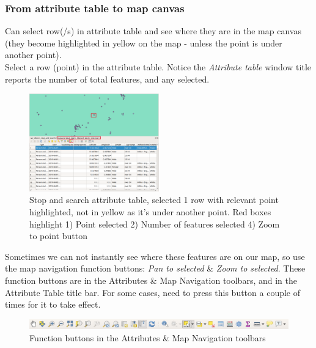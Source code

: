 \subsubsection{From attribute table to map canvas}
Can select row(/s) in attribute table and see where they are in the map canvas (they become highlighted in yellow on the map - unless the point is under another point).\\

Select a row (point) in the attribute table. Notice the \textit{Attribute table} window title reports the number of total features, and any selected.\\

\begin{figure}[!h]
	\centering
	\includegraphics[width=0.5\textwidth]{images/stop_search_one_row_selected_redbox.png}%
	\caption{Stop and search attribute table, selected 1 row with relevant point highlighted, not in yellow as it's under another point. Red boxes highlight 1) Point selected 2) Number of features selected 4) Zoom to point button}
	\label{ft_fig_firstfig3}
\end{figure}

Sometimes we can not instantly see where these features are on our map, so use the map navigation function buttons: \textit{Pan to selected} \& \textit{Zoom to selected}. These function buttons are in the Attributes \& Map Navigation toolbars, and in the Attribute Table title bar. For some cases, need to press this button a couple of times for it to take effect.

\begin{figure}[!h]
	\centering
	\includegraphics[width=1\textwidth]{images/attribute_and_map_navigation_toolbars_icons.png}
	\caption{Function buttons in the Attributes \& Map Navigation toolbars}
	\label{ft_fig_firstfig3}
\end{figure}

